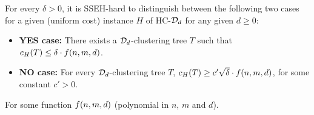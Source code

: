 \begin{theorem}\label{thm:hac-d-inapproximability}
    For every $\delta > 0$, it is \textsc{SSEH}-hard to distinguish between the following two cases for a given (uniform cost) instance $H$ of \textsc{HC-$\mathcal{D}_d$} for any given $d\geq 0$:
    \begin{itemize}
        \item \textbf{YES case:} There exists a $\mathcal{D}_d$-clustering tree $T$ such that ${c}_H\mathopen{}\left( T \right)\leq \delta \cdot f\mathopen{}\left(  n, m, d \right)$.
        \item \textbf{NO case:} For every $\mathcal{D}_d$-clustering tree $T$, ${c}_H\mathopen{}\left( T \right)\geq c'\sqrt{\delta} \cdot f\mathopen{}\left(  n, m, d \right)$, for some constant $c' > 0$.
    \end{itemize}
    For some function $f\mathopen{}\left( n, m, d \right)$ (polynomial in $n$, $m$ and $d$).
\end{theorem}
